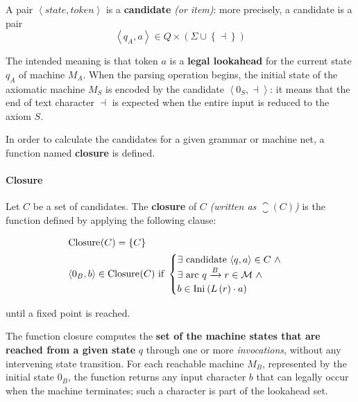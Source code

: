 \documentclass[english]{article}
\begin{document}
\begin{definition}[Candidate]
  A pair \(\left\langle \textit{state}, \textit{token} \right\rangle\) is a \textbf{candidate} \textit{(or item)}:
  more precisely, a candidate is a pair
  \[ \left\langle q_A, a \right\rangle \in Q \times \left( \Sigma \cup \left\{ \dashv \right\} \right) \]
\end{definition}

The intended meaning is that token \(a\) is a \textbf{legal lookahead} for the current state \(q_A\) of machine \(M_A\).
When the parsing operation begins, the initial state of the axiomatic machine \(M_S\) is encoded by the candidate \(\left\langle 0_S, \dashv \right\rangle\):
it means that the end of text character \(\dashv\) is expected when the entire input is reduced to the axiom \(S\).

In order to calculate the candidates for a given grammar or machine net, a function named \textbf{closure} is defined.

\paragraph{Closure}
\label{par:closure}

\begin{definition}[Closure]
  \label{def:closure}
  Let \(C\) be a set of candidates.
  The \textbf{closure} of \(C\) \textit{(written as \(\closure(C)\))} is the function defined by applying the following clause:

  \begin{align*}
     & \closure(C) = \{C\}                                  \\
     & \langle 0_B, b \rangle \in \closure(C) \ \text{if} \
    \begin{cases} \exists \ \text{candidate} \ \langle q,a \rangle \in C \ \land \\ \exists \ \text{arc} \  q \xrightarrow{B} r \in \mathcal{M} \ \land \\ b \in \Ini \left( L \left( r \right) \cdot a \right) \end{cases}
  \end{align*}

  until a fixed point is reached.
\end{definition}

\bigskip
The function closure computes the \textbf{set of the machine states that are reached from a given state} \(q\) through one or more \textit{invocations}, without any intervening state transition.
For each reachable machine \(M_B\), represented by the initial state \(0_B\), the function returns any input character \(b\) that can legally occur when the machine terminates;
such a character is part of the lookahead set.
\end{document}

